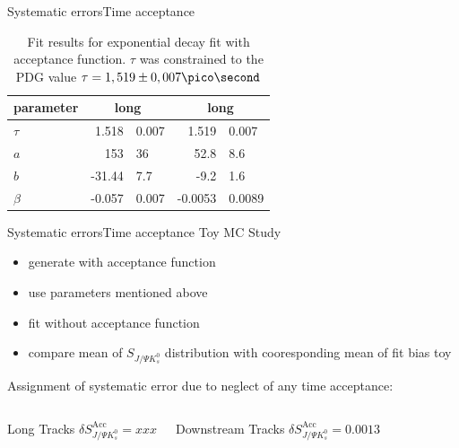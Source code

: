 \documentclass{beamer}
\newcommand{\SJPsi}{S_{J/\Psi K_s^0}}
\begin{document}
\begin{frame}{Systematic errors}{Time acceptance}
\begin{table}
\caption{Fit results for exponential decay fit with acceptance function. $\tau$ was constrained to the PDG value $\tau = 1,519 \pm 0,007 \pico\second$}
\begin{tabular}{lr@{$\pm$}l r@{$\pm$}l}
\hline \hline 
parameter & \multicolumn{2}{c}{long} & \multicolumn{2}{c}{long} \\ \hline
$\tau$    & 1.518 & 0.007 & 1.519 & 0.007 \\
$a$       & 153 & 36 & 52.8 & 8.6 \\
$b$       & -31.44 & 7.7 & -9.2 & 1.6 \\
$\beta$   & -0.057 & 0.007 &  -0.0053 & 0.0089 \\ 
\hline \hline
\end{tabular}
\end{table}
\end{frame}

\begin{frame}{Systematic errors}{Time acceptance}
Toy MC Study
\begin{itemize}
\item generate with acceptance function 
\item use parameters mentioned above
\item fit without acceptance function
\item compare mean of $\SJPsi$ distribution with cooresponding mean of fit bias toy
\end{itemize}

Assignment of systematic error due to neglect of any time acceptance:
	\begin{columns}
	\begin{block}{Long Tracks}
    \centering
        $\delta\SJPsi^{\text{Acc}} = xxx$
    \end{block}
	\begin{block}{Downstream Tracks}
    \centering
        $\delta\SJPsi^{\text{Acc}} = 0.0013$
    \end{block}
    \end{columns}


\end{frame}
\end{document}
